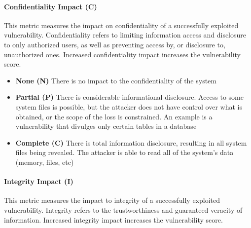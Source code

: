         \paragraph{Confidentiality Impact (C)}\label{par:confidentiality-impact-c}

          This metric measures the impact on confidentiality of a successfully
          exploited vulnerability. Confidentiality refers to limiting information
          access and disclosure to only authorized users, as well as preventing
          access by, or disclosure to, unauthorized ones. Increased
          confidentiality impact increases the vulnerability score.

          \begin{itemize}
            \item
              \textbf{None (N)} There is no impact to the confidentiality of the
              system
            \item
              \textbf{Partial (P)} There is considerable informational
              disclosure. Access to some system files is possible, but the
              attacker does not have control over what is obtained, or the scope
              of the loss is constrained. An example is a vulnerability that
              divulges only certain tables in a database
            \item
              \textbf{Complete (C)} There is total information disclosure,
              resulting in all system files being revealed. The attacker is able
              to read all of the system's data (memory, files, etc)
          \end{itemize}

        \paragraph{Integrity Impact (I)}\label{par:integrity-impact-i}

          This metric measures the impact to integrity of a successfully exploited
          vulnerability. Integrity refers to the trustworthiness and guaranteed
          veracity of information. Increased integrity impact increases the
          vulnerability score.

